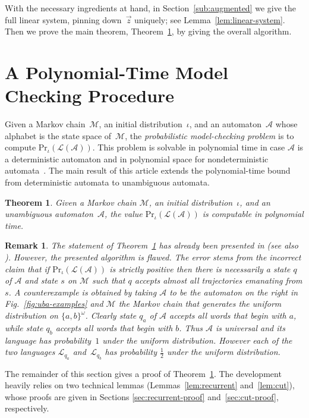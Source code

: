 \documentclass{elsarticle}
\newtheorem{theorem}[definition]{Theorem}
\newtheorem{remark}{Remark}[section]
\def\cA{\mathcal{A}}
\def\cL{\mathcal{L}}
\def\cM{\mathcal{M}}
\def\Pr{\mathrm{Pr}}
\begin{document}
With the necessary ingredients at hand, in Section~\ref{sub:augmented} we give the full linear system, pinning down~$\vec{z}$ uniquely; see Lemma~\ref{lem:linear-system}.
Then we prove the main theorem, Theorem~\ref{thm:PMC-MC-UBA}, by giving the overall algorithm.

\section{A Polynomial-Time Model Checking Procedure}
\label{sec:uba}

Given a Markov chain~$\cM$, an initial distribution~$\iota$, and an
automaton~$\cA$ whose alphabet is the state space of~$\cM$, the
\emph{probabilistic model-checking problem} is to compute
$\Pr_\iota(\cL(\cA))$.  This problem is solvable in polynomial
time in case $\cA$ is a deterministic automaton and in polynomial space for nondeterministic automata~\cite{CY95,BusRubVar04}.
The main result of this article
extends the polynomial-time bound from deterministic automata to
unambiguous automata.

\begin{theorem}
  \label{thm:PMC-MC-UBA}
  Given a Markov chain $\cM$, an initial distribution~$\iota$, and an
  unambiguous automaton~$\cA$, the value $\Pr_\iota(\cL(\cA))$
  is computable in polynomial time.
\end{theorem}

\begin{remark}
\label{rem:counter-example-uba}
The statement of Theorem~\ref{thm:PMC-MC-UBA} has already been presented
in \cite{BLW13} (see also \cite{LenhardtThesis13,BenLenWor14}). However, the
presented algorithm is flawed.
The error stems from the incorrect claim that if $\Pr_\iota(\cL(\cA))$
is strictly positive then there is necessarily a state $q$ of $\cA$
and state $s$ on $\cM$ such that $q$ accepts almost all trajectories
emanating from $s$.
A counterexample is obtained by taking
$\cA$ to be the automaton on the right in Fig.~\ref{fig:uba-examples}
and $\cM$ the Markov chain that generates the uniform distribution on
$\{a,b\}^\omega$.  Clearly state $q_a$ of $\cA$ accepts all words that begin
with $a$, while state $q_b$ accepts all words that begin with $b$.
Thus $\cA$ is universal and its language has probability~$1$ under the
uniform distribution.  However each of the two languages $\cL_{q_a}$ and~$\cL_{q_b}$
has probability $\frac{1}{2}$ under the uniform distribution.
\end{remark}

The remainder of this section gives a proof of
Theorem~\ref{thm:PMC-MC-UBA}.  The development heavily relies on two
technical lemmas (Lemmas~\ref{lem:recurrent} and~\ref{lem:cut}), whose
proofs are given in Sections \ref{sec:recurrent-proof}
and~\ref{sec:cut-proof}, respectively.
\end{document}
